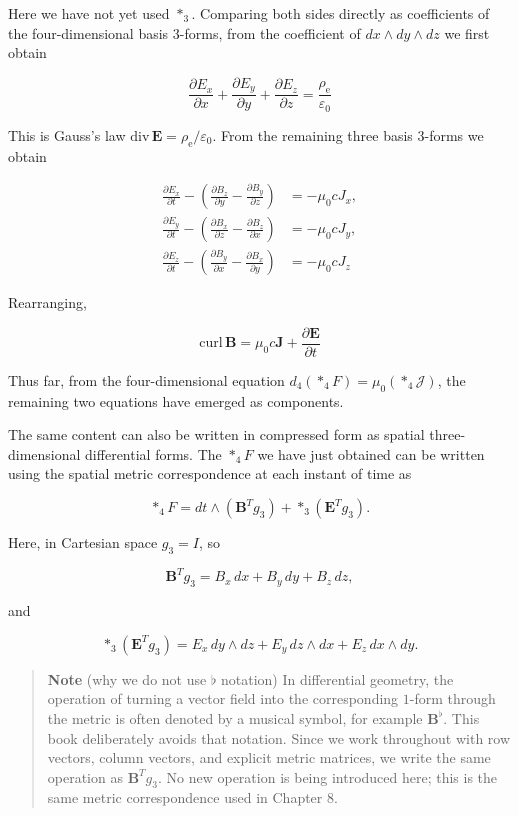 Here we have not yet used \(\ast_3\). Comparing both sides directly as
coefficients of the four-dimensional basis \(3\)-forms, from the
coefficient of \(dx\wedge dy\wedge dz\) we first obtain

\[
\frac{\partial E_x}{\partial x}+\frac{\partial E_y}{\partial y}+\frac{\partial E_z}{\partial z}=\frac{\rho_{\mathrm e}}{\varepsilon_0}
\]

This is Gauss's law
\(\mathrm{div}\,\mathbf E=\rho_{\mathrm e}/\varepsilon_0\). From the
remaining three basis \(3\)-forms we obtain

\[
\begin{aligned}
\frac{\partial E_x}{\partial t}-\left(\frac{\partial B_z}{\partial y}-\frac{\partial B_y}{\partial z}\right)&=-\mu_0 cJ_x,\\
\frac{\partial E_y}{\partial t}-\left(\frac{\partial B_x}{\partial z}-\frac{\partial B_z}{\partial x}\right)&=-\mu_0 cJ_y,\\
\frac{\partial E_z}{\partial t}-\left(\frac{\partial B_y}{\partial x}-\frac{\partial B_x}{\partial y}\right)&=-\mu_0 cJ_z
\end{aligned}
\]

Rearranging,

\[
\mathrm{curl}\,\mathbf{B} = \mu_0 c \mathbf{J} + \frac{\partial \mathbf{E}}{\partial t}
\]

Thus far, from the four-dimensional equation
\(d_4(\ast_4F)=\mu_0(\ast_4\mathcal{J})\), the remaining two equations
have emerged as components.

The same content can also be written in compressed form as spatial
three-dimensional differential forms. The \(\ast_4F\) we have just
obtained can be written using the spatial metric correspondence at each
instant of time as

\[
\ast_4F
=
dt\wedge(\mathbf B^Tg_3)+\ast_3(\mathbf E^Tg_3).
\]

Here, in Cartesian space \(g_3=I\), so

\[
\mathbf B^Tg_3
=
B_x\,dx+B_y\,dy+B_z\,dz,
\]

and

\[
\ast_3(\mathbf E^Tg_3)
=
E_x\,dy\wedge dz+E_y\,dz\wedge dx+E_z\,dx\wedge dy.
\]

\begin{quote}
\textbf{Note} (why we do not use \(\flat\) notation) In differential
geometry, the operation of turning a vector field into the corresponding
\(1\)-form through the metric is often denoted by a musical symbol, for
example \(\mathbf B^\flat\). This book deliberately avoids that
notation. Since we work throughout with row vectors, column vectors, and
explicit metric matrices, we write the same operation as
\(\mathbf B^Tg_3\). No new operation is being introduced here; this is
the same metric correspondence used in Chapter 8.
\end{quote}

